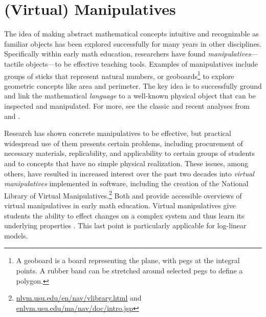 \documentclass[11pt,letterpaper]{article}
\newcommand{\Note}[1]{}
\renewcommand{\Note}[1]{\hl{[#1]}}  %
\newcommand{\NoteSigned}[3]{{\sethlcolor{#2}\Note{#1: #3}}}
\newcommand{\NoteFF}[1]{\NoteSigned{FF}{LightBlue}{#1}}
\newcommand{\NoteJE}[1]{\NoteSigned{JE}{LightGreen}{#1}}
\begin{document}
\section{(Virtual) Manipulatives}
The idea of making abstract mathematical concepts intuitive and recognizable as familiar objects 
has been explored successfully for many years in other disciplines. Specifically within early 
math education, researchers have found \textit{manipulatives}---tactile
objects---to be effective teaching tools. Examples of manipulatives include groups of 
sticks that represent natural numbers, or geoboards\footnote{A
  geoboard is a board representing the plane, with pegs at the integral points.  A rubber
  band can be stretched around selected pegs to define a polygon.}
to explore geometric concepts like area and perimeter. The key idea is to 
successfully ground and link the mathematical \textit{language} to a well-known physical 
object that can be inspected and manipulated.  For more, see the classic and recent analyses from
 and .

Research has shown concrete manipulatives to be effective, but practical widespread use of them presents certain 
problems, including procurement of necessary materials, replicability,
and applicability to certain groups of students and to concepts
that have no simple physical realization. These issues, among others, have 
resulted in increased interest over the past two decades into
\textit{virtual manipulatives} implemented in software, including the creation of 
the National Library of Virtual Manipulatives.\footnote{\url{nlvm.usu.edu/en/nav/vlibrary.html} and 
\url{enlvm.usu.edu/ma/nav/doc/intro.jsp}} 
Both  and  provide accessible overviews of 
virtual manipulatives in early math education. 
Virtual manipulatives give students the ability to effect changes on a complex system and thus learn its underlying 
properties \cite{moyer2002virtual}.  This last point is particularly applicable for log-linear models.

\end{document}
